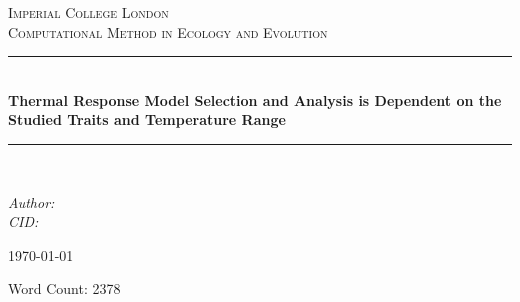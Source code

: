 
\begin{titlepage} %
	\newcommand{\HRule}{\rule{\linewidth}{0.5mm}} %
	
	\center %
	
	
	\textsc{\LARGE Imperial College London}\\[2.5cm] %
	
	\textsc{\Large Computational Method in Ecology and Evolution}\\[2.5cm] %
	

	
	\HRule\\[0.6cm]
	
	{\huge\bfseries Thermal Response Model Selection and Analysis is Dependent on the Studied Traits and Temperature Range}\\[0.4cm] %
	
	\HRule\\[2.5cm]
	
	
	\begin{minipage}{0.4\textwidth}
		\begin{center}
			\large
			\textit{Author: }
			\\
			\textit{CID: }
		\end{center}
	\end{minipage}

	
	
	
	\vfill\vfill\vfill %
	
	{\large\today} %

	 
	
	\vfill %
	Word Count: 2378

\end{titlepage}


